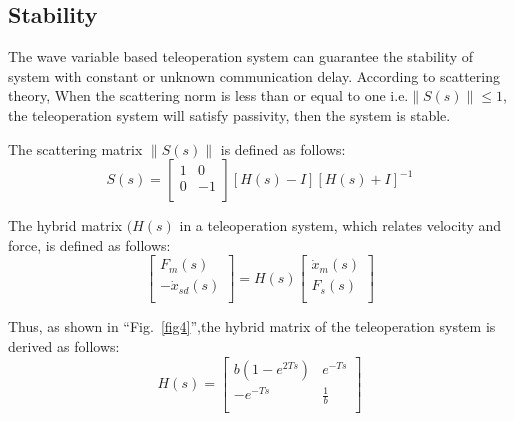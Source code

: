 \subsection{Stability}
The wave variable based teleoperation system can
guarantee the stability of system with constant or unknown communication delay.
According to scattering theory\cite{b7},
When the scattering norm is less than or equal to one i.e.$\left\| S(s) \right\|\le 1$,
the teleoperation system will satisfy passivity, then the system is stable.
\par The scattering matrix $\left\| S(s) \right\|$ is defined as follows:
\begin{equation}
    S(s)=\left[ \begin{matrix}
            1 & 0  \\
            0 & -1 \\
        \end{matrix} \right]\left[ H(s)-I \right]{{\left[ H(s)+I \right]}^{-1}}\label{eq15}
\end{equation}
\par The hybrid matrix $(H(s)$ in a teleoperation system, which relates velocity and force, is defined as follows:
\begin{equation}
    \left[ \begin{matrix}
            {{F}_{m}}(s)           \\
            -{{{\dot{x}}}_{sd}}(s) \\
        \end{matrix} \right]=H(s)\left[ \begin{matrix}
            {{{\dot{x}}}_{m}}(s) \\
            {{F}_{s}}(s)         \\
        \end{matrix} \right]\label{eq16}
\end{equation}
\par Thus, as shown in ``Fig.~\ref{fig4}'',the hybrid matrix of the teleoperation system  is derived as follows:
\begin{equation}
    H(s)=\left[ \begin{matrix}
            b(1-{{e}^{2Ts}}) & {{e}^{-Ts}} \\
            -{{e}^{-Ts}}     & \frac{1}{b} \\
        \end{matrix} \right] \label{eq17}
\end{equation}

